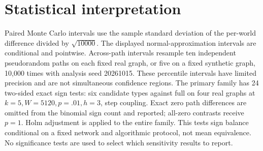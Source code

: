 \documentclass[11pt]{article}
\begin{document}
\section{Statistical interpretation}
Paired Monte Carlo intervals use the sample standard deviation of the per-world difference divided by $\sqrt{10000}$. The displayed normal-approximation intervals are conditional and pointwise. Across-path intervals resample ten independent pseudorandom paths on each fixed real graph, or five on a fixed synthetic graph, 10,000 times with analysis seed 20261015. These percentile intervals have limited precision and are not simultaneous confidence regions.
The primary family has 24 two-sided exact sign tests: six candidate types against full on four real graphs at $k=5,W=5120,p=.01,h=3$, step coupling. Exact zero path differences are omitted from the binomial sign count and reported; all-zero contrasts receive $p=1$. Holm adjustment is applied to the entire family. This tests sign balance conditional on a fixed network and algorithmic protocol, not mean equivalence. No significance tests are used to select which sensitivity results to report.
\end{document}
